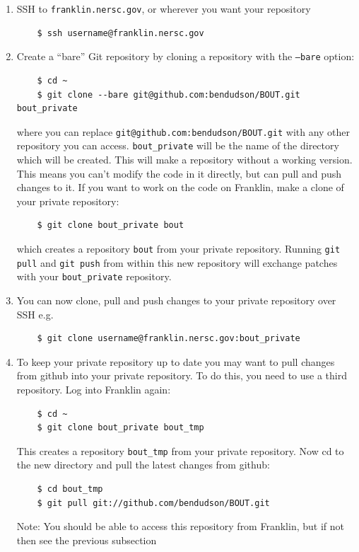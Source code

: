 \documentclass[12pt]{article}
\begin{document}
\begin{enumerate}
\item SSH to \texttt{franklin.nersc.gov}, or wherever you want your
  repository
  \begin{verbatim}
    $ ssh username@franklin.nersc.gov
  \end{verbatim}
\item Create a ``bare'' Git repository by cloning a repository with the \texttt{--bare} option:
  \begin{verbatim}
    $ cd ~
    $ git clone --bare git@github.com:bendudson/BOUT.git  bout_private
  \end{verbatim}
  where you can replace \texttt{git@github.com:bendudson/BOUT.git} with any other repository you can access.
  \texttt{bout\_private} will be the name of the directory which will be created.
  This will make a repository without a working version. This means you can't modify the
  code in it directly, but can pull and push changes to it. If you want to work on the code on Franklin,
  make a clone of your private repository:
  \begin{verbatim}
    $ git clone bout_private bout
  \end{verbatim}
  which creates a repository \texttt{bout} from your private repository. Running \texttt{git pull} and
  \texttt{git push} from within this new repository will exchange patches with your \texttt{bout\_private}
  repository.
\item You can now clone, pull and push changes to your private repository over SSH e.g.
  \begin{verbatim}
    $ git clone username@franklin.nersc.gov:bout_private
  \end{verbatim}
\item To keep your private repository up to date you may want to pull changes from
  github into your private repository. To do this, you need to use a third repository. Log into
  Franklin again:
  \begin{verbatim}
    $ cd ~
    $ git clone bout_private bout_tmp
  \end{verbatim}
  This creates a repository \texttt{bout\_tmp} from your private repository. Now cd to the new directory
  and pull the latest changes from github:
  \begin{verbatim}
    $ cd bout_tmp
    $ git pull git://github.com/bendudson/BOUT.git
  \end{verbatim}
  Note: You should be able to access this repository from Franklin, but if not then see the previous subsection

\end{enumerate}
\end{document}
